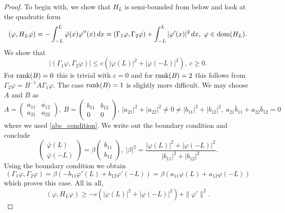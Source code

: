 \begin{proof}
To begin with, we show that $H_L$ is semi-bounded from below and look at the quadratic form
\begin{equation*}
  (\varphi,H_L\varphi)
     = - \int_{-L}^L \bar \varphi(x)\varphi''(x)\, dx
     = (\Gamma_1\varphi,\Gamma_2\varphi) + \int_{-L}^L |\varphi'(x)|^2\, dx,\ \varphi\in\operatorname{dom}(H_L) .
\end{equation*}
We show that
\begin{equation*}
  | (\Gamma_1\varphi,\Gamma_2\varphi) | \leq c ( |\varphi(L)|^2 + |\varphi(-L)|^2 ) ,\ c\geq 0 .
\end{equation*}
For $\operatorname{rank}(B)=0$ this is trivial with $c=0$ and for $\operatorname{rank}(B)=2$ this follows from $\Gamma_2\varphi = B^{-1}A\Gamma_1\varphi$.
The case $\operatorname{rank}(B)=1$ is slightly more difficult. We may choose $A$ and $B$ as
\begin{equation*}
  A =
\begin{pmatrix}
  a_{11} & a_{12} \\
  a_{21} & a_{22}
\end{pmatrix}
  ,\
  B = 
\begin{pmatrix}
  b_{11} & b_{12} \\
  0     & 0 
\end{pmatrix} 
  , \   |a_{21}|^2 + |a_{22}|^2 \neq 0 \neq |b_{11}|^2 + |b_{12}|^2,\   a_{21}\bar b_{11} + a_{22}\bar b_{12} = 0
\end{equation*}
where we used \eqref{abc_condition}. We write out the boundary condition and conclude
\begin{equation*}
\begin{pmatrix}
  \bar\varphi(L) \\ \bar\varphi(-L)
\end{pmatrix}
  = \beta
\begin{pmatrix}
  b_{11} \\ b_{12}
\end{pmatrix}
  ,\ |\beta|^2 = \frac{|\varphi(L)|^2 + |\varphi(-L)|^2}{|b_{11}|^2 + |b_{12}|^2} .
\end{equation*}
Using the boundary condition we obtain
\begin{equation*}
  (\Gamma_1\varphi,\Gamma_2\varphi) 
    = \beta ( - b_{11}\varphi'(L) + b_{12}\varphi'(-L) )
    = \beta ( a_{11}\varphi(L) + a_{12}\varphi(-L) )
\end{equation*}
which proves this case. All in all,
\begin{equation*}
  (\varphi,H_L\varphi) \geq -c ( |\varphi(L)|^2 + |\varphi(-L)|^2 ) + \|\varphi'\|^2 .
\end{equation*}

\end{proof}
